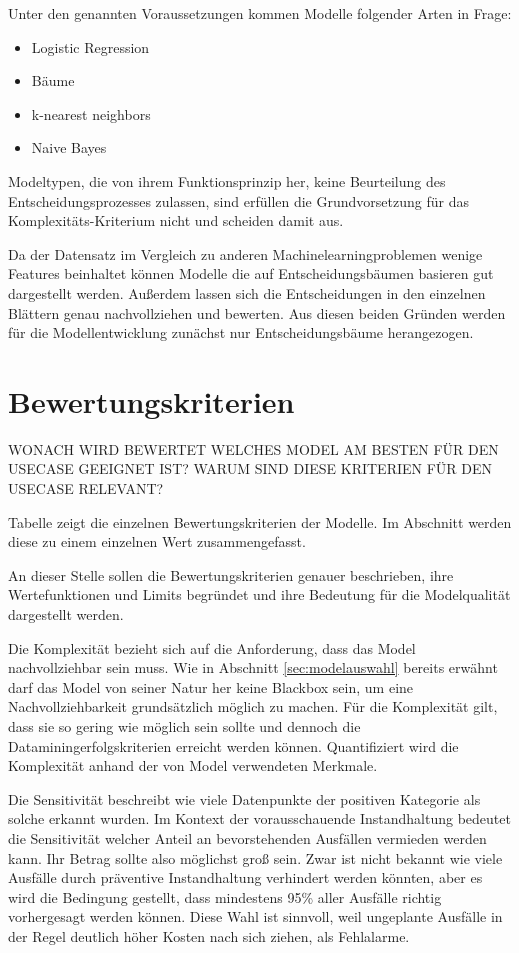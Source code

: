 Unter den genannten Voraussetzungen kommen Modelle folgender Arten in Frage:
\begin{itemize}
    \item Logistic Regression
    \item Bäume
    \item k-nearest neighbors
    \item Naive Bayes
\end{itemize}

Modeltypen, die von ihrem Funktionsprinzip her, keine Beurteilung des Entscheidungsprozesses zulassen, sind erfüllen die Grundvorsetzung für das Komplexitäts-Kriterium nicht und scheiden damit aus.

Da der Datensatz im Vergleich zu anderen Machinelearningproblemen wenige Features beinhaltet  können Modelle die auf Entscheidungsbäumen basieren gut dargestellt werden. Außerdem lassen sich die Entscheidungen in den einzelnen Blättern genau nachvollziehen und bewerten. Aus diesen beiden Gründen werden für die Modellentwicklung zunächst nur Entscheidungsbäume herangezogen. 

\section{Bewertungskriterien}
\label{sec:bewertungskriterien}
WONACH WIRD BEWERTET WELCHES MODEL AM BESTEN FÜR DEN USECASE GEEIGNET IST? WARUM SIND DIESE KRITERIEN FÜR DEN USECASE RELEVANT?

Tabelle  zeigt die einzelnen Bewertungskriterien der Modelle. Im Abschnitt  werden diese zu einem einzelnen Wert zusammengefasst. 

An dieser Stelle sollen die Bewertungskriterien genauer beschrieben, ihre Wertefunktionen und Limits begründet und ihre Bedeutung für die Modelqualität dargestellt werden.

Die Komplexität bezieht sich auf die Anforderung, dass das Model nachvollziehbar sein muss. Wie in Abschnitt \cref{sec:modelauswahl} bereits erwähnt darf das Model von seiner Natur her keine Blackbox sein, um eine Nachvollziehbarkeit grundsätzlich möglich zu machen. Für die Komplexität gilt, dass sie so gering wie möglich sein sollte und dennoch die Dataminingerfolgskriterien erreicht werden können. Quantifiziert wird die Komplexität anhand der von Model verwendeten Merkmale. 

Die Sensitivität beschreibt wie viele Datenpunkte der positiven Kategorie als solche erkannt wurden. Im Kontext der vorausschauende Instandhaltung bedeutet die Sensitivität welcher Anteil an bevorstehenden Ausfällen vermieden werden kann. Ihr Betrag sollte also möglichst groß sein. Zwar ist nicht bekannt wie viele Ausfälle durch präventive Instandhaltung verhindert werden könnten, aber es wird die Bedingung gestellt, dass mindestens 95\% aller Ausfälle richtig vorhergesagt werden können. Diese Wahl ist sinnvoll, weil ungeplante Ausfälle in der Regel deutlich höher Kosten nach sich ziehen, als Fehlalarme.

